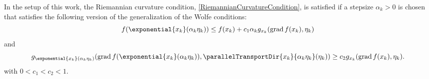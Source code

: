 In the setup of this work, the Riemannian curvature condition, \cref{RiemannianCurvatureCondition}, is satisfied if a stepsize $\alpha_k > 0$ is chosen that satisfies the following version of the generalization of the Wolfe conditions:
\begin{equation}\label{RiemannianWolfeConditions1}
    f( \exponential{x_k}(\alpha_k \eta_k)) \leq f(x_k) + c_1 \alpha_k g_{x_k} (\operatorname{grad} f(x_k), \eta_k)
\end{equation}
and 
\begin{equation}\label{RiemannianWolfeConditions2.2}
    g_{\exponential{x_k}(\alpha_k \eta_k)} (\operatorname{grad} f(\exponential{x_k}(\alpha_k \eta_k)), \parallelTransportDir{x_k}{\alpha_k \eta_k}(\eta_k)) \geq c_2 g_{x_k} (\operatorname{grad} f(x_k), \eta_k).
\end{equation}
with $0 < c_1 < c_2 < 1$.

